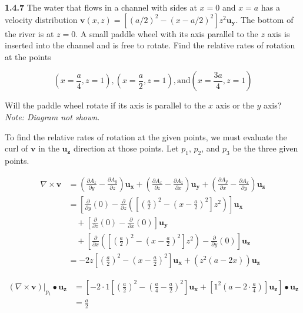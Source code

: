 \documentclass{article}
\begin{document}
\textbf{1.4.7} The water that flows in a channel with sides at $x = 0$ and $x = a$ has a velocity distribution
$\mathbf{v}{(x,z)} = [{(a/2)}^2 - {(x-a/2)}^2]z^2\mathbf{u_y}$. The bottom of the river is at $z = 0$. A small paddle
wheel with its axis parallel to the $z$ axis is inserted into the channel and is free to rotate. Find the relative rates
of rotation at the points

\begin{equation*}
	\left(x = \frac{a}{4}, z = 1\right), \left(x = \frac{a}{2}, z = 1\right), \text{and} \left(x = \frac{3a}{4}, z = 1\right)
\end{equation*}

Will the paddle wheel rotate if its axis is parallel to the $x$ axis or the $y$ axis? \@\textit{Note: Diagram not
	shown.}

\vspace{24pt}

To find the relative rates of rotation at the given points, we must evaluate the curl of $\mathbf{v}$ in the
$\mathbf{u_z}$ direction at those points. Let $p_1$, $p_2$, and $p_3$ be the three given points.

\begin{equation*}
	\begin{split}
		\nabla \times \mathbf{v} & = \left(\frac{\partial A_z}{\partial y} - \frac{\partial A_y}{\partial z}\right)\mathbf{u_x} + \left(\frac{\partial A_x}{\partial z} - \frac{\partial A_z}{\partial x}\right)\mathbf{u_y} + \left(\frac{\partial A_y}{\partial x} - \frac{\partial A_x}{\partial y}\right)\mathbf{u_z} \\
		& = \left[
			\frac{\partial}{\partial y}(0)
			- \frac{\partial}{\partial z}\left(\left[{\left(\frac{a}{2}\right)}^2
				- {\left(x - \frac{a}{2}\right)}^2\right]z^2\right)
			\right]\mathbf{u_x} \\
		& \quad + \left[\frac{\partial}{\partial z}(0) - \frac{\partial}{\partial x}{(0)}\right]\mathbf{u_y} \\
		& \quad + \left[
			\frac{\partial}{\partial x}\left(\left[{\left(\frac{a}{2}\right)}^2
				- {\left(x - \frac{a}{2}\right)}^2\right]z^2\right)
			- \frac{\partial}{\partial y}(0)
			\right]\mathbf{u_z} \\
		& = -2z \left[{\left(\frac{a}{2}\right)}^2 - {\left(x - \frac{a}{2}\right)}^2\right]\mathbf{u_x} + \left(z^2 (a - 2x)\right)\mathbf{u_z}
	\end{split}
\end{equation*}

\begin{equation*}
	\begin{split}
		\left(\nabla \times \mathbf{v}\right) \rvert_{p_1} \bullet \mathbf{u_z} & = \left[
		-2 \cdot 1 \left[
		{\left(\frac{a}{2}\right)}^2
		- {\left(\frac{a}{4} - \frac{a}{2}\right)}^2
		\right] \mathbf{u_x}
		+ \left[
			1^2 \left(a - 2 \cdot \frac{a}{4}\right)
			\right] \mathbf{u_z}
		\right] \bullet \mathbf{u_z} \\
		& = \frac{a}{2}
	\end{split}
\end{equation*}
\end{document}
